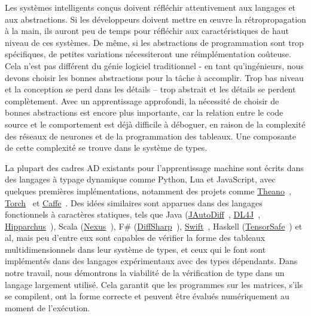 Les systèmes intelligents conçus doivent réfléchir attentivement aux langages et aux abstractions. Si les développeurs doivent mettre en œuvre la rétropropagation à la main, ils auront peu de temps pour réfléchir aux caractéristiques de haut niveau de ces systèmes. De même, si les abstractions de programmation sont trop spécifiques, de petites variations nécessiteront une réimplémentation coûteuse. Cela n'est pas différent du génie logiciel traditionnel - en tant qu'ingénieurs, nous devons choisir les bonnes abstractions pour la tâche à accomplir. Trop bas niveau et la conception se perd dans les détails -- trop abstrait et les détails se perdent complètement. Avec un apprentissage approfondi, la nécessité de choisir de bonnes abstractions est encore plus importante, car la relation entre le code source et le comportement est déjà difficile à déboguer, en raison de la complexité des réseaux de neurones et de la programmation des tableaux. Une composante de cette complexité se trouve dans le système de types.

La plupart des cadres AD existants pour l'apprentissage machine sont écrits dans des langages à typage dynamique comme Python, Lua et JavaScript, avec quelques premières implémentations, notamment des projets comme \href{http://deeplearning.net/software/theano/}{Theano}~\citep{bergstra2010theano}, \href{http://torch.ch/}{Torch}~\citep{collobert2002torch} et \href{https://caffe.berkeleyvision.org/}{Caffe}~\citep{jia2014caffe}. Des idées similaires sont apparues dans des langages fonctionnels à caractères statiques, tels que Java (\href{https://github.com/uniker9/JAutoDiff}{JAutoDiff}~\citep{nureki2012jautodiff}, \href{https://deeplearning4j.org/}{DL4J}~\citep{team2016dl4j}, \href{https://github.com/Hipparchus-Math/hipparchus}{Hipparchus}~\citep{andrea2016automatic}), Scala (\href{https://tongfei. me/nexus/}{Nexus}~\citep{chen2017typesafe}), F\# (\href{http://diffsharp.github.io/DiffSharp/}{DiffSharp}~\citep{baydin2015diffsharp}), \href{https://www. tensorflow.org/swift}{Swift}~\citep{lattner2018tensorflow}, Haskell (\href{https://github.com/leopiney/tensor-safe}{TensorSafe}~\citep{pineyro2019structure}) et al, mais peu d'entre eux sont capables de vérifier la forme des tableaux multidimensionnels dans leur système de types, et ceux qui le font sont implémentés dans des langages expérimentaux avec des types dépendants. Dans notre travail, nous démontrons la viabilité de la vérification de type dans un langage largement utilisé. Cela garantit que les programmes sur les matrices, s'ils se compilent, ont la forme correcte et peuvent être évalués numériquement au moment de l'exécution.

